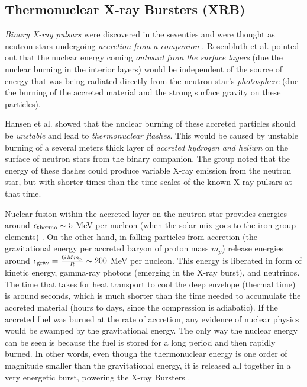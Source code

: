 






\subsection{Thermonuclear X-ray Bursters (XRB)}

{{\it Binary X-ray pulsars} were discovered in the seventies and were thought as  neutron stars undergoing {\it accretion from a companion} \cite{WLP80}. Rosenbluth et al. \cite{RO73} pointed out that the nuclear energy coming {\it outward from the surface layers} (due the nuclear burning in the interior layers) would be independent of the source of energy that was being radiated directly from the neutron star's {\it photosphere} (due the burning of the accreted material and the strong surface gravity on these particles). 

\quad

Hansen et al. \cite{HVH75} showed that the nuclear burning of these accreted particles should be {\it unstable} and lead to {\it thermonuclear flashes}. This would be caused by  unstable burning of a several meters thick layer of {\it accreted hydrogen and helium} on the surface of neutron stars from the binary companion.  The group noted that the energy of these flashes could produce variable X-ray emission from the neutron star, but with shorter times than the time scales of the known X-ray pulsars at that time. 

  
\quad

Nuclear  fusion within the accreted layer on the neutron star provides energies around $\epsilon_{\rm thermo} \sim 5$ MeV per nucleon (when the solar mix goes to the iron group elements) \cite{BI00}. On the other hand, in-falling particles from accretion (\ie the gravitational energy per accreted baryon of proton mass $m_p$) release energies around
$\epsilon_{\rm grav} = \frac{GM m_p}{R} \sim 200$ MeV per nucleon. This energy is liberated in form of kinetic energy, gamma-ray photons (emerging in the X-ray burst),  and neutrinos. The time that takes for heat transport to cool the deep envelope (thermal time) is around seconds, which is much shorter than the time needed  to accumulate the  accreted material (hours to days, since the compression is adiabatic). If the accreted fuel was burned at the rate of accretion, any evidence of nuclear physics would be swamped by  the gravitational energy. The only way the nuclear energy can be seen is because the fuel is stored for a long period and then rapidly burned. In other words, even though the thermonuclear energy is one order  of magnitude smaller than the gravitational energy, it is released all together in a very energetic burst, powering the X-ray Bursters \cite{SB03}.

}
